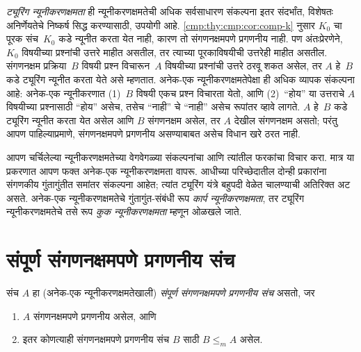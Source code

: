 \begin{digress}
\emph{ट्यूरिंग न्यूनीकरणक्षमता} ही न्यूनीकरणक्षमतेची अधिक
सर्वसाधारण संकल्पना इतर संदर्भांत, विशेषतः अनिर्णेयतेचे निष्कर्ष
सिद्ध करण्यासाठी, उपयोगी आहे. \ref{cmp:thy:cmp:cor:comp-k} नुसार
$K_0$ चा पूरक संच~$K_0$ कडे न्यूनीत करता येत नाही, कारण
तो संगणनक्षमपणे प्रगणनीय नाही. पण अंतःप्रेरणेने, $K_0$
विषयीच्या प्रश्नांची उत्तरे माहीत असतील, तर त्याच्या पूरकाविषयीची
उत्तरेही माहीत असतील. संगणनक्षम प्रक्रिया~$B$ विषयी प्रश्न
विचारून~$A$ विषयीच्या प्रश्नांची उत्तरे ठरवू शकत असेल, तर
$A$ हे~$B$ कडे ट्यूरिंग न्यूनीत करता येते असे म्हणतात.
अनेक-एक न्यूनीकरणक्षमतेपेक्षा ही अधिक व्यापक संकल्पना आहे:
अनेक-एक न्यूनीकरणात (1)~$B$ विषयी एकच प्रश्न विचारता येतो,
आणि (2)~``होय'' या उत्तराचे $A$ विषयीच्या प्रश्नासाठी
``होय'' असेच, तसेच ``नाही'' चे ``नाही'' असेच रूपांतर व्हावे
लागते. $A$ हे~$B$ कडे ट्यूरिंग न्यूनीत करता येत असेल
आणि $B$ संगणनक्षम असेल, तर $A$ देखील संगणनक्षम असतो;
परंतु आपण पाहिल्याप्रमाणे, संगणनक्षमपणे प्रगणनीय असण्याबाबत
असेच विधान खरे ठरत नाही.

आपण चर्चिलेल्या न्यूनीकरणक्षमतेच्या वेगवेगळ्या संकल्पनांचा
आणि त्यांतील फरकांचा विचार करा. मात्र या प्रकरणात आपण फक्त
अनेक-एक न्यूनीकरणक्षमता वापरू. आधीच्या परिच्छेदातील दोन्ही
प्रकारांना संगणकीय गुंतागुंतीत समांतर संकल्पना आहेत; त्यांत
ट्यूरिंग यंत्रे बहुपदी वेळेत चालण्याची अतिरिक्त अट असते.
अनेक-एक न्यूनीकरणक्षमतेचे गुंतागुंत-संबंधी रूप
\emph{कार्प न्यूनीकरणक्षमता}, तर ट्यूरिंग न्यूनीकरणक्षमतेचे
तसे रूप \emph{कुक न्यूनीकरणक्षमता} म्हणून ओळखले जाते.
\end{digress}











\section{संपूर्ण संगणनक्षमपणे प्रगणनीय संच}\label{cmp:thy:cce:sec}

\begin{defn}
संच $A$ हा (अनेक-एक न्यूनीकरणक्षमतेखाली) \emph{संपूर्ण
संगणनक्षमपणे प्रगणनीय संच} असतो, जर
\begin{enumerate}
\item $A$ संगणनक्षमपणे प्रगणनीय असेल, आणि
\item इतर कोणत्याही संगणनक्षमपणे प्रगणनीय संच $B$ साठी $B \leq_m A$ असेल.
\end{enumerate}
\end{defn}

